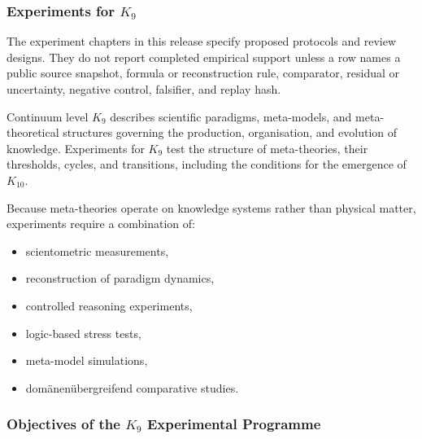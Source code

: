 
\subsubsection{Experiments for \texorpdfstring{$K_9$}{K_9}}

The experiment chapters in this release specify proposed protocols and review designs. They do not report completed empirical support unless a row names a public source snapshot, formula or reconstruction rule, comparator, residual or uncertainty, negative control, falsifier, and replay hash.
\label{sec:experiments-k9}

Continuum level $K_9$ describes scientific paradigms,
meta-models, and meta-theoretical structures governing the
production, organisation, and evolution of knowledge.
Experiments for $K_9$ test the structure of meta-theories,
their thresholds, cycles, and transitions, including the
conditions for the emergence of $K_{10}$.

Because meta-theories operate on knowledge systems rather than
physical matter, experiments require a combination of:

\begin{itemize}
    \item scientometric measurements,
    \item reconstruction of paradigm dynamics,
    \item controlled reasoning experiments,
    \item logic-based stress tests,
    \item meta-model simulations,
    \item domänenübergreifend comparative studies.
\end{itemize}



\subsubsection{Objectives of the \texorpdfstring{$K_9$}{K_9} Experimental Programme}


